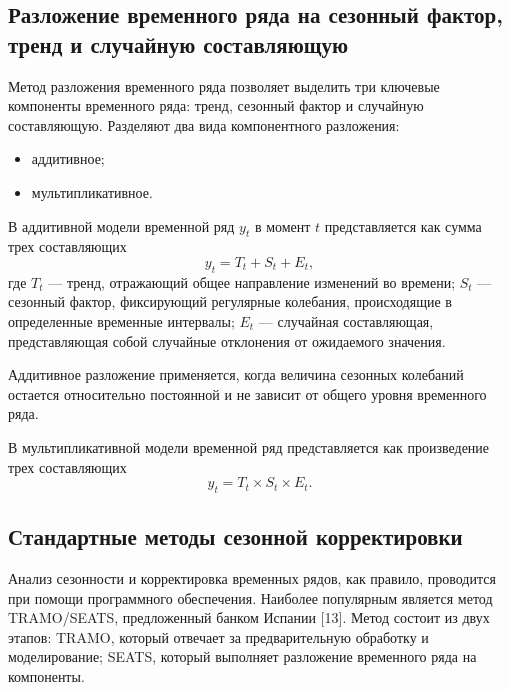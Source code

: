 \documentclass[a4paper, 14pt]{extreport}
\numberwithin{equation}{subsection}
\numberwithin{equation}{section}
\begin{document}
	\subsection{Разложение временного ряда на сезонный фактор, тренд и случайную составляющую} \label{subsec:decomp}
	Метод разложения временного ряда позволяет выделить три ключевые компоненты временного ряда: тренд, сезонный фактор и случайную составляющую. Разделяют два вида компонентного разложения:
	\begin{itemize}
		\item аддитивное;
		\item мультипликативное.
	\end{itemize}
	В аддитивной модели временной ряд $y_t$ в момент $t$ представляется как сумма трех составляющих
	\begin{equation}
		y_t = T_t + S_t + E_t,
	\end{equation}
	где $T_t$ --- тренд, отражающий общее направление изменений во времени; $S_t$ --- сезонный фактор, фиксирующий регулярные колебания, происходящие в определенные временные интервалы; $E_t$ --- случайная составляющая, представляющая собой случайные отклонения от ожидаемого значения.
	
	Аддитивное разложение применяется, когда величина сезонных колебаний остается относительно постоянной и не зависит от общего уровня временного ряда.

	В мультипликативной модели временной ряд представляется как произведение трех составляющих
	\begin{equation}
		y_t = T_t \times S_t \times E_t.
	\end{equation}
	\subsection{Стандартные методы сезонной корректировки}
	\label{subsec:sadj}
	Анализ сезонности и корректировка временных рядов, как правило, проводится при помощи программного обеспечения. Наиболее популярным является метод TRAMO/SEATS, предложенный банком Испании [13]. Метод состоит из двух этапов: TRAMO, который отвечает за предварительную обработку и моделирование; SEATS, который выполняет разложение временного ряда на компоненты.
\end{document}
